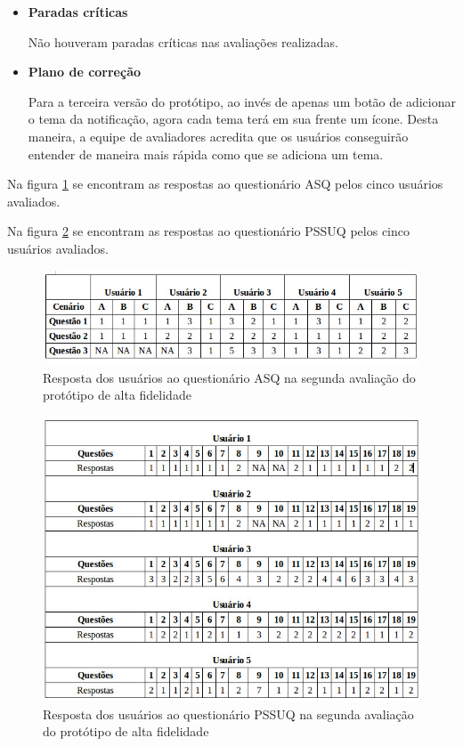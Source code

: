 \begin{itemize}
    \item \textbf{Paradas críticas}
    
      \subitem Não houveram paradas críticas nas avaliações realizadas.
    
    \item \textbf{Plano de correção}
    
      \subitem Para a terceira versão do protótipo, ao invés de apenas um botão de adicionar o tema da notificação, 
      agora cada tema terá em sua frente um ícone. Desta maneira, a equipe de avaliadores acredita que os usuários 
      conseguirão entender de maneira mais rápida como que se adiciona um tema.
    
  \end{itemize}
  
  Na figura \ref{asqalta_2} se encontram as respostas ao questionário ASQ pelos cinco usuários avaliados.
  
  Na figura \ref{pssuqalta_2} se encontram as respostas ao questionário PSSUQ pelos cinco usuários avaliados.
  
  \begin{figure}[!htb]
  \centering
  \includegraphics[scale=0.6]{figuras/asqalta_2.jpg}
  \caption{Resposta dos usuários ao questionário ASQ na segunda avaliação do protótipo de alta fidelidade}
  \label{asqalta_2}
  \end{figure}
   
  
  \begin{figure}[!htb]
  \centering
  \includegraphics[scale=0.6]{figuras/pssuqalta_2.jpg}
  \caption{Resposta dos usuários ao questionário PSSUQ na segunda avaliação do protótipo de alta fidelidade}
  \label{pssuqalta_2}
  \end{figure}  